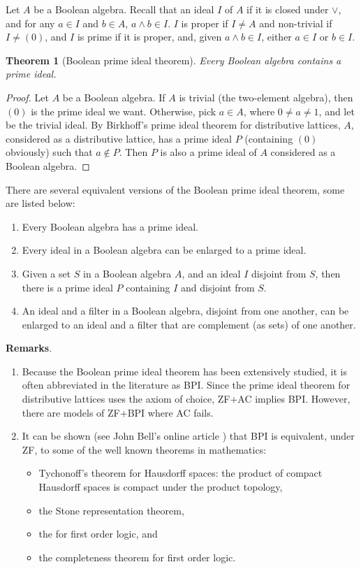 \documentclass[12pt]{article}
\newtheorem{thm}{Theorem}
\begin{document}
Let $A$ be a Boolean algebra.  Recall that an ideal $I$ of $A$ if it is closed under $\vee$, and for any $a\in I$ and $b\in A$, $a\wedge b\in I$.  $I$ is proper if $I\ne A$ and non-trivial if $I\ne (0)$, and $I$ is prime if it is proper, and, given $a\wedge b\in I$, either $a\in I$ or $b\in I$.

\begin{thm}[Boolean prime ideal theorem]  Every Boolean algebra contains a prime ideal.
\end{thm}

\begin{proof}  Let $A$ be a Boolean algebra.  If $A$ is trivial (the two-element algebra), then $(0)$ is the prime ideal we want.  Otherwise, pick $a\in A$, where $0\ne a\ne 1$, and let be the trivial ideal.  By Birkhoff's prime ideal theorem for distributive lattices, $A$, considered as a distributive lattice, has a prime ideal $P$ (containing $(0)$ obviously) such that $a\notin P$.  Then $P$ is also a prime ideal of $A$ considered as a Boolean algebra.
\end{proof}

There are several equivalent versions of the Boolean prime ideal theorem, some are listed below:
\begin{enumerate}
\item Every Boolean algebra has a prime ideal.
\item Every ideal in a Boolean algebra can be enlarged to a prime ideal.
\item Given a set $S$ in a Boolean algebra $A$, and an ideal $I$ disjoint from $S$, then there is a prime ideal $P$ containing $I$ and disjoint from $S$.
\item An ideal and a filter in a Boolean algebra, disjoint from one another, can be enlarged to an ideal and a filter that are complement (as sets) of one another.
\end{enumerate}

\textbf{Remarks}.  
\begin{enumerate}
\item
Because the Boolean prime ideal theorem has been extensively studied, it is often abbreviated in the literature as BPI.  Since the prime ideal theorem for distributive lattices uses the axiom of choice, ZF+AC implies BPI.  However, there are models of ZF+BPI where AC fails.
\item
It can be shown (see John Bell's online article ) that BPI is equivalent, under ZF, to some of the well known theorems in mathematics:
\begin{itemize}
\item Tychonoff's theorem for Hausdorff spaces: the product of compact Hausdorff spaces is compact under the product topology,
\item the Stone representation theorem,
\item the  for first order logic, and
\item the completeness theorem for first order logic.
\end{itemize}
\end{enumerate}
\end{document}

